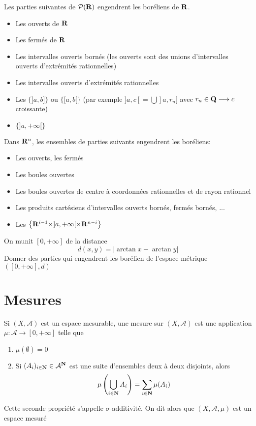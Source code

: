 \begin{prop}
    Les parties suivantes de $\mathcal  P(\mathbf R)$ engendrent les boréliens de $\mathbf R$.
    \begin{itemize}
        \item Les ouverts de $\mathbf R$
        \item Les fermés de $\mathbf R$
        \item Les intervalles ouverts bornés (les ouverts sont des unions d'intervalles ouverts d'extrémités rationnelles)
        \item Les intervalles ouverts d'extrémités rationnelles
        \item Les $\{]a, b]\}$ ou  $\{[a, b[\}$ (par exemple $]a, c[=\bigcup ]a, r_n]$ avec  $r_n \in \mathbf Q \longrightarrow c$ croissante)
        \item $\{]a, +\infty[\}$
    \end{itemize}
\end{prop}

\begin{prop}
Dans $\mathbf R^n$, les ensembles de parties suivants engendrent les boréliens:
\begin{itemize}
    \item Les ouverts, les fermés
    \item Les boules ouvertes
    \item Les boules ouvertes de centre à coordonnées rationnelles et de rayon rationnel
    \item Les produits cartésiens d'intervalles ouverts bornés, fermés bornés, ...
    \item Les $\left\{ \mathbf R^{i-1}\times ]a, +\infty[ \times \mathbf R^{n-i} \right\} $
\end{itemize}
\end{prop}

\begin{exo}
    On munit $[0, +\infty]$ de la distance \[
        d(x, y)= \left| \arctan x-\arctan y \right|
    \] 
    Donner des parties qui engendrent les borélien de l'espace métrique $([0, +\infty], d)$
\end{exo}

\section{Mesures}

\begin{dfn}
    Si $(X, \mathcal  A)$ est un espace mesurable, une mesure sur $(X, \mathcal  A)$ est une application $\mu: \mathcal  A \longrightarrow [0, +\infty]$ telle que \begin{enumerate}[label=(\emph{\roman*})]
        \item $\mu(\emptyset)=0$
        \item Si $(A_i)_{i \in  \mathbf N} \in  \mathcal  A^{\mathbf N}$ est une suite d'ensembles deux à deux disjoints, alors \[
                \mu \left(\bigcup_{i \in  \mathbf N}A_i\right)= \sum_{i \in  \mathbf N} \mu(A_i)
        \] 
    \end{enumerate}
    Cette seconde propriété s'appelle $\sigma$-additivité. On dit alors que $(X, \mathcal  A, \mu)$ est un espace mesuré
\end{dfn}


